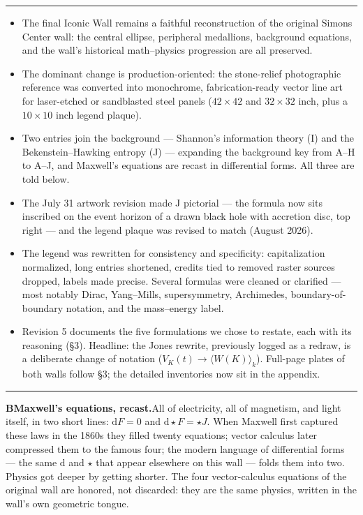 \documentclass[10pt]{article}
\newcommand{\head}[1]{\par\vspace{7pt}{\noindent\large\bfseries #1}\par
  \vspace{1pt}\noindent\rule{\linewidth}{0.4pt}\par\vspace{2pt}}
\begin{document}
\head{1\quad Executive summary}
\begin{itemize}
  \item The final Iconic Wall remains a faithful reconstruction of the
    original Simons Center wall: the central ellipse, peripheral
    medallions, background equations, and the wall's historical
    math--physics progression are all preserved.
  \item The dominant change is production-oriented: the stone-relief
    photographic reference was converted into monochrome,
    fabrication-ready vector line art for laser-etched or sandblasted
    steel panels ($42\times42$ and $32\times32$ inch, plus a
    $10\times10$ inch legend plaque).
  \item Two entries join the background --- Shannon's information theory
    (I) and the Bekenstein--Hawking entropy (J) --- expanding the
    background key from A--H to A--J, and Maxwell's equations are recast
    in differential forms. All three are told below.
  \item The July 31 artwork revision made J pictorial --- the formula
    now sits inscribed on the event horizon of a drawn black hole with
    accretion disc, top right --- and the legend plaque was revised to
    match (August 2026).
  \item The legend was rewritten for consistency and specificity:
    capitalization normalized, long entries shortened, credits tied to
    removed raster sources dropped, labels made precise. Several
    formulas were cleaned or clarified --- most notably Dirac,
    Yang--Mills, supersymmetry, Archimedes, boundary-of-boundary
    notation, and the mass--energy label.
  \item Revision 5 documents the five formulations we chose to
    restate, each with its reasoning (\S3). Headline: the Jones
    rewrite, previously logged as a redraw, is a deliberate change of
    notation ($V_K(t) \rightarrow \langle W(K)\rangle_k$). Full-page
    plates of both walls follow \S3; the detailed inventories now sit
    in the appendix.
\end{itemize}

\head{2\quad The three additions, in brief}

\textbf{B\quad Maxwell's equations, recast.}\enspace All of electricity,
all of magnetism, and light itself, in two short lines:
$\mathrm{d}F = 0$ and $\mathrm{d}{\star}F = {\star}J$. When Maxwell
first captured these laws in the 1860s they filled twenty equations;
vector calculus later compressed them to the famous four; the modern
language of differential forms --- the same $\mathrm{d}$ and $\star$
that appear elsewhere on this wall --- folds them into two. Physics got
deeper by getting shorter. The four vector-calculus equations of the
original wall are honored, not discarded: they are the same physics,
written in the wall's own geometric tongue.
\end{document}
